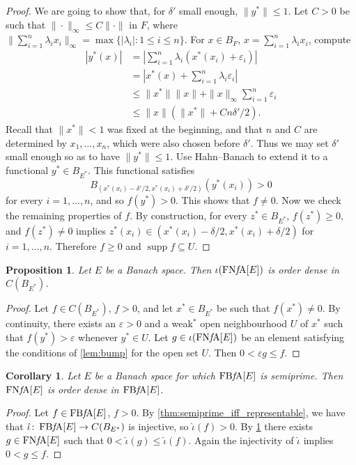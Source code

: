 \documentclass{memo-l}
\newtheorem{prop}[theorem]{Proposition}
\newtheorem{cor}[theorem]{Corollary}
\theoremstyle{definition}
\theoremstyle{remark}
\numberwithin{section}{chapter}
\numberwithin{equation}{chapter}
\newcommand{\FNFA}[1]{\operatorname{FN{\it f}\!A}[#1]}
\newcommand{\FBFA}[1]{\operatorname{FB{\it f}\!A}[#1]}
\DeclareMathOperator{\supp}{supp}
\begin{document}
\begin{proof}
    We are going to show that, for $\delta '$ small enough,
    $\|y^{*}\|\le 1$. Let $C>0$ be such that $\|{\cdot }\|_\infty \le
    C\|{\cdot }\|$ in $F$, where $\|\sum_{i=1}^n \lambda_i x_i\|_\infty=\max\{|\lambda_i|:1\leq i\leq n\}$. For $x \in B_F$, $x=\sum_{i=1}^{n}\lambda
    _ix_i$, compute
    \begin{align*}
        |y^{*}(x)|&=\left| \sum_{i=1}^{n}\lambda
        _i(x^{*}(x_i)+\varepsilon _i) \right|\\
                  &=\left| x^{*}(x)+\sum_{i=1}^{n}\lambda
                  _i\varepsilon _i \right| \\
                  &\le \|x^{*}\|\|x\|+\|x\|_\infty
                  \sum_{i=1}^{n}\varepsilon _i\\
                  &\le \|x\|(\|x^{*}\|+Cn \delta '/2).
    \end{align*}
    Recall that $\|x^{*}\|<1$ was fixed at the beginning, and that $n$
    and $C$ are determined by $x_1,\ldots ,x_n$, which were also chosen
    before $\delta '$. Thus we may set $\delta '$ small enough so as
    to have $\|y^{*}\|\le 1$. Use Hahn--Banach to extend it to a
    functional $y^{*}\in B_{E^{*}}$. This functional satisfies
    \[
    B_{(x^{*}(x_i)-\delta'/2,x^{*}(x_i)+\delta'/2)}(y^{*}(x_i))>0
    \]
    for every $i=1,\ldots ,n$, and so $f(y^{*})>0$. This shows that
    $f\neq 0$. Now we check the remaining properties of $f$. By
    construction, for every $z^{*}\in B_{E^{*}}$, $f(z^{*})\ge 0$, and
    $f(z^{*})\neq 0$ implies $z^{*}(x_i) \in (x^{*}(x_i)-\delta
    /2,x^{*}(x_i)+\delta /2)$ for $i=1,\ldots ,n$. Therefore $f\ge 0$
    and $\supp f \subseteq U$.
\end{proof}

\begin{prop}\label{prop:ord_density}
    Let $E$ be a Banach space. Then $\iota (\FNFA E)$ is order dense in
    $C(B_{E^{*}})$.
\end{prop}
\begin{proof}
    Let $f \in C(B_{E^{*}})$, $f>0$, and let $x^{*}\in B_{E^{*}}$ be
    such that $f(x^{*})\neq 0$. By continuity, there exists an
    $\varepsilon >0$ and a weak$^*$ open neighbourhood $U$ of $x^{*}$
    such that $f(y^{*})>\varepsilon $ whenever $y^{*}\in U$. Let $g
    \in \iota (\FNFA E)$ be an element satisfying the conditions of
    \cref{lem:bump} for the open set $U$. Then $0<\varepsilon g\le f$.
\end{proof}

\begin{cor}\label{cor:ord_dense_FBFA}
    Let $E$ be a Banach space for which $\FBFA E$ is semiprime. Then
    $\FNFA E$ is order dense in $\FBFA E$.
\end{cor}
\begin{proof}
    Let $f \in \FBFA E$, $f>0$. By \cref{thm:semiprime_iff_representable}, we have that $\hat{\iota }\colon \FBFA
    E\to C(B_{E^{*}})$ is injective, so $\hat{\iota } (f)>0$. By
    \cref{prop:ord_density} there exists $g \in \FNFA E$ such that
    $0<\hat{\iota} (g)\le \hat{\iota }(f)$. Again the
    injectivity of $\hat{\iota }$ implies $0<g\le f$.
\end{proof}
\end{document}

